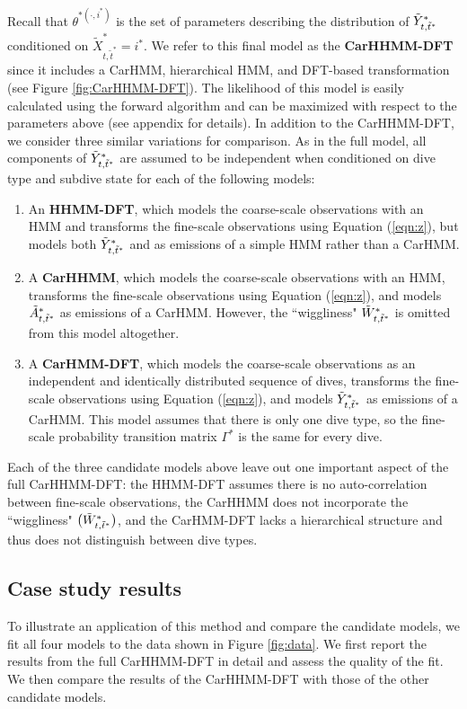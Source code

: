 %
Recall that $\theta^{*(\cdot,i^*)}$ is the set of parameters describing the distribution of $\tilde{Y}^*_{t,\tilde t^*}$ conditioned on $\tilde X^*_{t,\tilde t^*} = i^*$. 
%
We refer to this final model as the \textbf{CarHHMM-DFT} since it includes a CarHMM, hierarchical HMM, and DFT-based transformation (see Figure \ref{fig:CarHHMM-DFT}). The likelihood of this model is easily calculated using the forward algorithm and can be maximized with respect to the parameters above (see appendix for details). In addition to the CarHHMM-DFT, we consider three similar variations for comparison. As in the full model, all components of $\tilde{Y}^*_{t,\tilde t^*}$ are assumed to be independent when conditioned on dive type and subdive state for each of the following models:
\begin{enumerate}
    \item An \textbf{HHMM-DFT}, which models the coarse-scale observations with an HMM and transforms the fine-scale observations using Equation (\ref{eqn:z}), but models both $\tilde{Y}^*_{t,\tilde t^*}$ and as emissions of a simple HMM rather than a CarHMM.
    \item A \textbf{CarHHMM}, which models the coarse-scale observations with an HMM, transforms the fine-scale observations using Equation (\ref{eqn:z}), and models $\tilde{A}^*_{t,\tilde t^*}$ as emissions of a CarHMM. However, the ``wiggliness"  $\tilde{W}^*_{t,\tilde t^*}$ is omitted from this model altogether.
    \item A \textbf{CarHMM-DFT}, which models the coarse-scale observations as an independent and identically distributed sequence of dives, transforms the fine-scale observations using Equation (\ref{eqn:z}), and models $\tilde{Y}^*_{t,\tilde t^*}$ as emissions of a CarHMM. This model assumes that there is only one dive type, so the fine-scale probability transition matrix $\Gamma^*$ is the same for every dive. 
\end{enumerate}
%
Each of the three candidate models above leave out one important aspect of the full CarHHMM-DFT: the HHMM-DFT assumes there is no auto-correlation between fine-scale observations, the CarHHMM does not incorporate the ``wiggliness" $\big(\tilde{W}^*_{t,\tilde t^*}\big)$, and the CarHMM-DFT lacks a hierarchical structure and thus does not distinguish between dive types.

\subsection{Case study results}

To illustrate an application of this method and compare the candidate models, we fit all four models to the data shown in Figure \ref{fig:data}. We first report the results from the full CarHHMM-DFT in detail and assess the quality of the fit. We then compare the results of the CarHHMM-DFT with those of the other candidate models.

